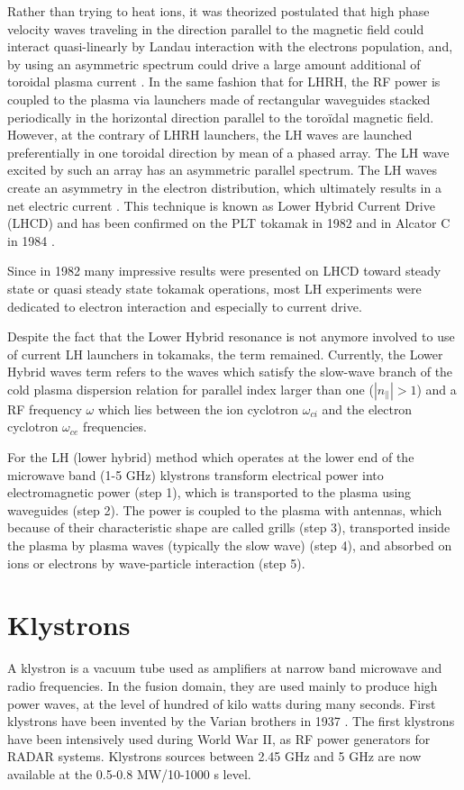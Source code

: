 Rather than trying to heat ions, it was theorized postulated that high phase velocity waves traveling in the direction parallel to the magnetic field could interact quasi-linearly by Landau interaction with the electrons population, and, by using an asymmetric spectrum could drive a large amount additional of toroidal plasma current \parencite{Fisch1978}. In the same fashion that for LHRH, the RF power is coupled to the plasma via launchers made of rectangular waveguides stacked periodically in the horizontal direction parallel to the toroïdal magnetic field. However, at the contrary of LHRH launchers, the LH waves are launched preferentially in one toroidal direction by mean of a phased array. The LH wave excited by such an array has an asymmetric parallel spectrum. The LH waves create an asymmetry in the electron distribution, which ultimately results in a net electric current \parencite{Fisch1987}. This technique is known as Lower Hybrid Current Drive (LHCD) and has been confirmed on the PLT tokamak in 1982 \parencite{Bernabei1982, Motley1985, Jobes1985} and in Alcator C in 1984 \parencite{Porkolab1984}. 

Since in 1982 many impressive results were presented on LHCD\parencite{Hooke1982, Porkolab1982, Tonon1982} toward steady state or quasi steady state tokamak operations, most LH experiments were dedicated to electron interaction and especially to current drive. 

Despite the fact that the Lower Hybrid resonance is not anymore involved to use of current LH launchers in tokamaks, the term remained. Currently, the Lower Hybrid waves term refers to the waves which satisfy the slow-wave branch of the cold plasma dispersion relation for parallel index larger than one ($|n_{\parallel}|>1$) and a RF frequency $\omega$ which lies between the ion cyclotron $\omega_{ci}$ and the electron cyclotron $\omega_{ce}$ frequencies. 

For the LH (lower hybrid) method which operates at the lower end of the microwave band (1-5 GHz) klystrons transform electrical power into electromagnetic power (step 1), which is transported to the plasma using waveguides (step 2). The power is coupled to the plasma with antennas, which because of their characteristic shape are called grills (step 3), transported inside the plasma by plasma waves (typically the slow wave) (step 4), and absorbed on ions or electrons by wave-particle interaction (step 5).

\section{Klystrons}
A klystron is a vacuum tube used as amplifiers at narrow band microwave and radio frequencies. In the fusion domain, they are used mainly to produce high power waves, at the level of hundred of kilo watts during many seconds. First klystrons have been invented by the Varian brothers in 1937 \parencite{Pond2008}. The first klystrons have been intensively used during World War II, as RF power generators for RADAR systems. Klystrons sources between 2.45 GHz and 5 GHz are now available at the 0.5-0.8 MW/10-1000 s level\parencite{Pond2008}. 

